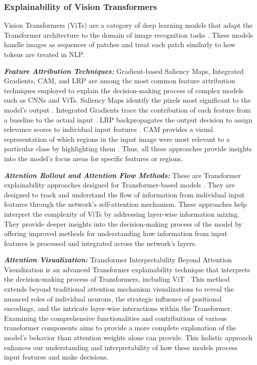 \documentclass[final,5p,times,twocolumn]{elsarticle}
\begin{document}
\subsubsection{Explainability of Vision Transformers}
Vision Transformers (ViTs) are a category of deep learning models that adapt the Transformer architecture to the domain of image recognition tasks \cite{dosovitskiy2020image}. These models handle images as sequences of patches and treat each patch similarly to how tokens are treated in NLP.

\textbf{\textit{Feature Attribution Techniques:}}
Gradient-based Saliency Maps, Integrated Gradients, CAM, and LRP are among the most common feature attribution techniques employed to explain the decision-making process of complex models such as CNNs and ViTs. Saliency Maps identify the pixels most significant to the model's output \cite{zeiler2014visualizing}. Integrated Gradients trace the contribution of each feature from a baseline to the actual input \cite{pmlr-v70-sundararajan17a}. LRP backpropagates the output decision to assign relevance scores to individual input features \cite{chefer2021transformer}. CAM provides a visual representation of which regions in the input image were most relevant to a particular class by highlighting them \cite{krizhevsky2017imagenet}. Thus, all these approaches provide insights into the model's focus areas for specific features or regions. 

\textbf{\textit{Attention Rollout and Attention Flow Methods:}}
These are Transformer explainability approaches designed for Transformer-based models \cite{abnar2020quantifying}. They are designed to track and understand the flow of information from individual input features through the network's self-attention mechanism. These approaches help interpret the complexity of ViTs by addressing layer-wise information mixing. They provide deeper insights into the decision-making process of the model by offering improved methods for understanding how information from input features is processed and integrated across the network's layers.

\textbf{\textit{Attention Visualization:}}
Transformer Interpretability Beyond Attention Visualization is an advanced Transformer explainability technique that interprets the decision-making process of Transformers, including ViT  \cite{chefer2021transformer}. This method extends beyond traditional attention mechanism visualizations to reveal the nuanced roles of individual neurons, the strategic influence of positional encodings, and the intricate layer-wise interactions within the Transformer. Examining the comprehensive functionalities and contributions of various transformer components aims to provide a more complete explanation of the model's behavior than attention weights alone can provide. This holistic approach enhances our understanding and interpretability of how these models process input features and make decisions.
\end{document}
